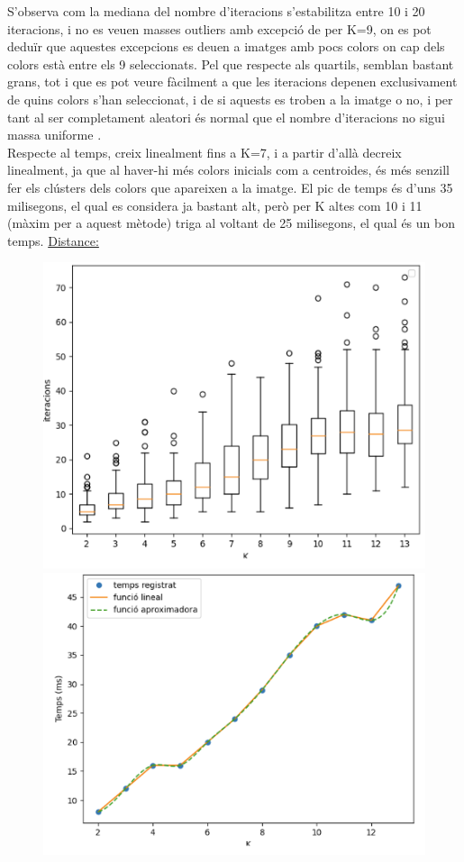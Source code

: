 \documentclass[a4paper, 11pt]{article}
\begin{document}
\justify
S'observa com la mediana del nombre d'iteracions s'estabilitza entre 10 i 20 iteracions, i no es veuen masses outliers amb excepció de per K=9, on es pot deduïr que aquestes excepcions es deuen a imatges amb pocs colors on cap dels colors està entre els 9 seleccionats. Pel que respecte als quartils, semblan bastant grans, tot i que es pot veure fàcilment a que les iteracions depenen exclusivament de quins colors s'han seleccionat, i de si aquests es troben a la imatge o no, i per tant al ser completament aleatori és normal que el nombre d'iteracions no sigui massa uniforme .\\
Respecte al temps, creix linealment fins a K=7, i a partir d'allà decreix linealment, ja que al haver-hi més colors inicials com a centroides, és més senzill fer els clústers dels colors que apareixen a la imatge. El pic de temps és d'uns 35 milisegons, el qual es considera ja bastant alt, però per K altes com 10 i 11 (màxim per a aquest mètode) triga al voltant de 25 milisegons, el qual és un bon temps.
\center\underline{Distance:}
\begin{figure}[h!]
\centering
\begin{minipage}{.5\textwidth}
  \centering
  \includegraphics[width=.8\linewidth]{boxplot_distance_centroides.PNG}
\end{minipage}%
\begin{minipage}{.5\textwidth}
  \centering
  \includegraphics[width=.8\linewidth]{temps_distance_centroides.PNG}
\end{minipage}
\end{figure}
\end{document}
